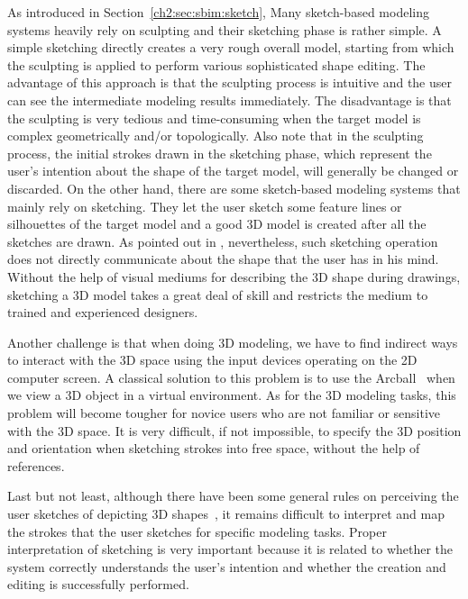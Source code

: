 As introduced in Section~\ref{ch2:sec:sbim:sketch},
Many sketch-based modeling systems heavily rely on sculpting and
their sketching phase is rather simple. A simple sketching
directly creates a very rough overall model, starting from which the
sculpting is applied to perform various sophisticated shape editing.
The advantage of this approach is that the sculpting process is
intuitive and the user can see the intermediate modeling results
immediately. The disadvantage is that the sculpting is very tedious
and time-consuming when the target model is complex geometrically
and/or topologically. Also note that in the sculpting process, the
initial strokes drawn in the sketching phase, which represent the
user's intention about the shape of the target model, will generally
be changed or discarded. On the other hand, there are some
sketch-based modeling systems that mainly rely on
sketching. They let the user sketch some feature lines or silhouettes of
the target model and a good 3D model is created after all the sketches
are drawn. As pointed out in \cite{CIW08}, nevertheless, such sketching
operation does not directly communicate about the shape that the user
has in his mind. Without the help of visual mediums for describing the 3D shape
during drawings, sketching a 3D model takes a great deal of skill
and restricts the medium to trained and experienced designers.


Another challenge is that when doing 3D modeling, we have to find
indirect ways to interact with the 3D space using the input devices
operating on the 2D computer screen. A classical solution to this
problem is to use the Arcball~\cite{SK92} when we view a 3D object
in a virtual environment. As for the 3D modeling tasks, this problem
will become tougher for novice users who are not familiar or
sensitive with the 3D space. It is very difficult, if not
impossible, to specify the 3D position and orientation when
sketching strokes into free space, without the help of references.

Last but not least, although there have been  some general rules on
perceiving the user sketches of depicting 3D shapes~\cite{HD00}, it
remains difficult to interpret and map the strokes that the user
sketches for specific modeling tasks. Proper interpretation of
sketching is very important because it is related to whether the
system correctly understands the user's intention and whether the
creation and editing is successfully performed.

